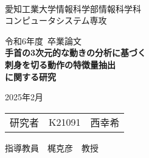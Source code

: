 \begin{titlepage}

\ \\
\begin{center}

{\LARGE 愛知工業大学情報科学部情報科学科\\
コンピュータシステム専攻

\vspace{1.0cm}

令和6年度~卒業論文\\

\vspace{2.0cm}
{\Huge
\baselineskip=15mm
\textbf{手首の3次元的な動きの分析に基づく\\
刺身を切る動作の特徴量抽出\\に関する研究\\}}

\vspace{7.0cm}

2025年2月\\

\vspace{1.0cm}

\begin{tabular}[h]{lll}
  研究者  & K21091 & 西幸希\\
\end{tabular}

\vspace{1.0cm}

指導教員\ \ 梶克彦\ \ 教授}

\end{center}

\end{titlepage}
